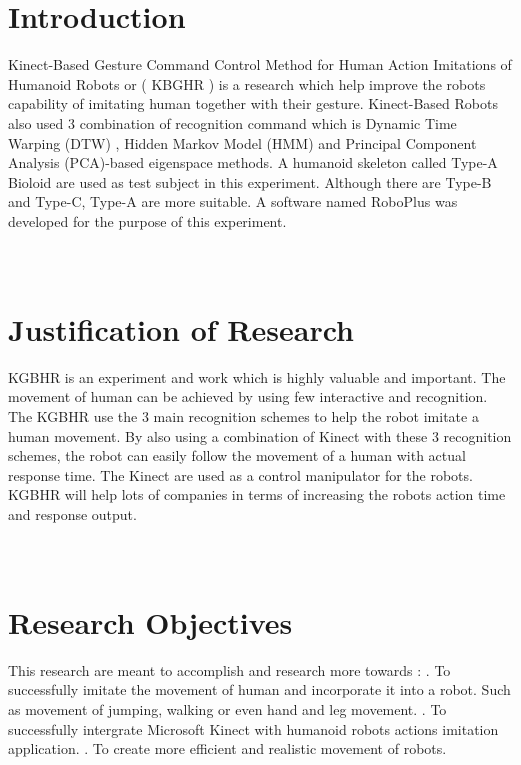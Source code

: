 \documentclass[a4paper,12pt]{article}
\begin{document}
\newpage
\setcounter{page}{1}
\section{Introduction} 
\hspace*{1cm} Kinect-Based Gesture Command Control Method for Human Action Imitations of Humanoid Robots or ( KBGHR ) is a research which help improve the robots capability of imitating human together with their gesture. Kinect-Based Robots also used 3 combination of recognition command which is Dynamic Time Warping (DTW) , Hidden Markov Model (HMM) and Principal Component Analysis (PCA)-based eigenspace methods. A humanoid skeleton called Type-A Bioloid are used as test subject in this experiment. Although there are Type-B and Type-C, Type-A are more suitable. A software named RoboPlus was developed for the purpose of this experiment.
\\ \\ \\   
\section{Justification of Research}
\hspace{1cm} KGBHR is an experiment and work which is highly valuable and important. The movement of human can be achieved by using few interactive and recognition. The KGBHR use the 3 main recognition schemes to help the robot imitate a human movement. By also using a combination of Kinect with these 3 recognition schemes, the robot can easily follow the movement of a human with actual response time. The Kinect are used as a control manipulator for the robots. KGBHR will help lots of companies in terms of increasing the robots action time and response output.
\\ \\ \\
\section{Research Objectives}
\hspace*{1cm} This research are meant to accomplish and research more towards : . To successfully imitate the movement of human and incorporate it into a robot. Such as movement of jumping, walking or even hand and leg movement. 
. To successfully intergrate Microsoft Kinect with humanoid robots actions imitation  application.
. To create more efficient and realistic movement of robots.
\end{document}
